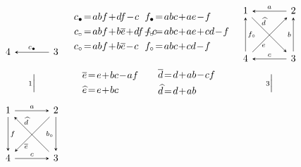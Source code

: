 \documentclass[11pt, letterpaper]{amsart}
\theoremstyle{definition}
\numberwithin{equation}{section}
\newcommand{\vmutation}[1]{  {\scriptstyle #1}{\Bigl|\Bigr.}  }
\def\nsquare{\scalebox{.85}{$\scriptscriptstyle\Box$}}
\begin{document}
\begin{figure}[ht]
\begin{equation*}
\begin{array}{ccccccccc}
\begin{tikzcd}[arrows={-stealth}, sep=\sepps]
  \\
   4 
   & 3  \arrow[l, "c_\bullet", swap, -stealth] 
\end{tikzcd}
 &\multicolumn{2}{c}{
 \begin{aligned} 
 c_\bullet &\!=\! abf\!+\!df\!-\!c\\
 c_{\nsquare}  &\!=\! abf\!+\!b\overline{e}\!+\!df\!-\!c\\
c_\circ &\!=\! abf\!+\!b\overline{e}\!-\!c
\end{aligned}
\hspace{-20pt}
 } 
& &
\multicolumn{2}{c}{
\hspace{-15pt}
 \begin{aligned}
  f_\bullet &\!=\! abc\!+\!ae\!-\!f \\
 f_{\nsquare} &\!=\! abc\!+\!ae\!+\!cd \!-\!f  \\
 f_\circ &\!=\! abc\!+\!cd \!-\!f 
 \end{aligned}
 }
 &  
\begin{tikzcd}[arrows={-stealth}, sep=\sepps]
  1  \arrow[r,  "a", stealth-] \arrow[dr, "\widehat{d}", near start, outer sep=\outsepd]  \arrow[d, "f_\circ", stealth-]  
  & 2  \arrow[d, swap, "b",stealth-] \arrow[dl, "e", near end, outer sep=\outsepe,stealth-]
  \\
   4 
   & 3  \arrow[l, "c", swap] 
\end{tikzcd}
 & \\
 \\[-8pt]
\vmutation{1}   & 
&\multicolumn{1}{c}{\begin{aligned} \overline{e} &\!=\! e \!+\! bc \!-\!af \\
\widehat{e}&\!=\!e\!+\!bc
\end{aligned}} & & 
\multicolumn{1}{c}{\begin{aligned} \overline{d} &\!=\! d \!+\! ab \!-\!cf \\
\widehat{d} &\!=\!d\!+\!ab \end{aligned} }& &\vmutation{3} \\[-6pt]
\\
\begin{tikzcd}[arrows={-stealth}, sep=\sepps]
  1  \arrow[r,  "a", -stealth] \arrow[dr, "\widehat{d}" near start, outer sep=\outsepd, stealth-]  \arrow[d, "f", -stealth]  
  & 2  \arrow[d, swap, "b_\circ", -stealth] \arrow[dl, "\overline{e}", near end, outer sep=\outsepe, -stealth]
  \\
   4 
   & 3  \arrow[l, "c", swap, stealth-] 
\end{tikzcd}

\end{array}
\end{equation*}
\end{figure}
\end{document}
